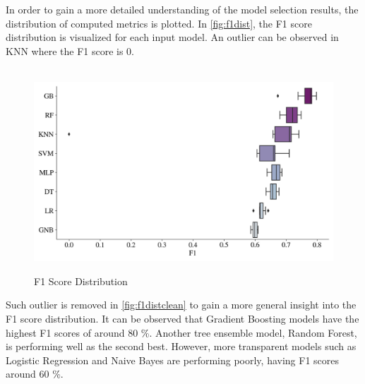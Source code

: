 \clearpage
\newpage
{}
\restoregeometry
\fancyheadoffset{0pt}

In order to gain a more detailed understanding of the model selection results, the distribution of computed metrics is plotted. In \autoref{fig:f1dist}, the F1 score distribution is visualized for each input model. An outlier can be observed in KNN where the F1 score is 0.				
\begin{figure}[H]
\centering
\caption{F1 Score Distribution}\vspace{0.5em}
\label{fig:f1dist}\
\includegraphics[width=140mm]{Figures/F1_Distribution.jpg}
\vspace{-1em}
\end{figure}
Such outlier is removed in \autoref{fig:f1distclean} to gain a more general insight into the F1 score distribution.
It can be observed that Gradient Boosting models have the highest F1 scores of around 80 \%.
Another tree ensemble model, Random Forest, is performing well as the second best. However, more transparent models such as Logistic Regression and Naive Bayes are performing poorly, having F1 scores around 60 \%.
